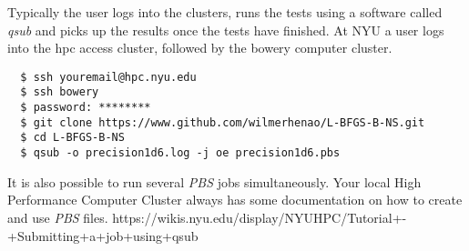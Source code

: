 Typically the user logs into the clusters, runs the tests using a software called \emph{qsub} and picks up the results once the tests have finished. At NYU a user logs into the hpc access cluster, followed by the bowery computer cluster.

\begin{lstlisting}
  $ ssh youremail@hpc.nyu.edu
  $ ssh bowery
  $ password: ********
  $ git clone https://www.github.com/wilmerhenao/L-BFGS-B-NS.git
  $ cd L-BFGS-B-NS
  $ qsub -o precision1d6.log -j oe precision1d6.pbs
\end{lstlisting}

It is also possible to run several \emph{PBS} jobs simultaneously. Your local High Performance Computer Cluster always has some documentation on how to create and use \emph{PBS} files. https://wikis.nyu.edu/display/NYUHPC/Tutorial+-+Submitting+a+job+using+qsub
